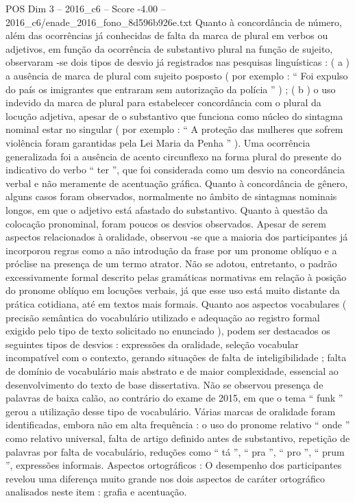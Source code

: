\begin{textsample}{POS Dim 3 – 2016\_c6 – Score -4.00 – 2016\_c6/enade\_2016\_fono\_8d596b926e.txt}
Quanto à concordância de número, além das ocorrências já conhecidas de falta da marca de plural em verbos ou adjetivos, em função da ocorrência de substantivo plural na função de sujeito, observaram -se dois tipos de desvio já registrados nas pesquisas linguísticas : ( a ) a ausência de marca de plural com sujeito posposto ( por exemplo : “ Foi expulso do país os imigrantes que entraram sem autorização da polícia ” ) ; ( b ) o uso indevido da marca de plural para estabelecer concordância com o plural da locução adjetiva, apesar de o substantivo que funciona como núcleo do sintagma nominal estar no singular ( por exemplo : “ A proteção das mulheres que sofrem violência foram garantidas pela Lei Maria da Penha ” ).
Uma ocorrência generalizada foi a ausência de acento circunflexo na forma plural do presente do indicativo do verbo “ ter ”, que foi considerada como um desvio na concordância verbal e não meramente de acentuação gráfica.
Quanto à concordância de gênero, alguns casos foram observados, normalmente no âmbito de sintagmas nominais longos, em que o adjetivo está afastado do substantivo.
Quanto à questão da colocação pronominal, foram poucos os desvios observados.
Apesar de serem aspectos relacionados à oralidade, observou -se que a maioria dos participantes já incorporou regras como a não introdução da frase por um pronome oblíquo e a próclise na presença de um termo atrator.
Não se adotou, entretanto, o padrão excessivamente formal descrito pelas gramáticas normativas em relação à posição do pronome oblíquo em locuções verbais, já que esse uso está muito distante da prática cotidiana, até em textos mais formais.
Quanto aos aspectos vocabulares ( precisão semântica do vocabulário utilizado e adequação ao registro formal exigido pelo tipo de texto solicitado no enunciado ), podem ser destacados os seguintes tipos de desvios : expressões da oralidade, seleção vocabular incompatível com o contexto, gerando situações de falta de inteligibilidade ; falta de domínio de vocabulário mais abstrato e de maior complexidade, essencial ao desenvolvimento do texto de base dissertativa.
Não se observou presença de palavras de baixa calão, ao contrário do exame de 2015, em que o tema “ funk ” gerou a utilização desse tipo de vocabulário.
Várias marcas de oralidade foram identificadas, embora não em alta frequência : o uso do pronome relativo “ onde ” como relativo universal, falta de artigo definido antes de substantivo, repetição de palavras por falta de vocabulário, reduções como “ tá ”, “ pra ”, “ pro ”, “ prum ”, expressões informais.
Aspectos ortográficos : O desempenho dos participantes revelou uma diferença muito grande nos dois aspectos de caráter ortográfico analisados neste item : grafia e acentuação.

\end{textsample}
